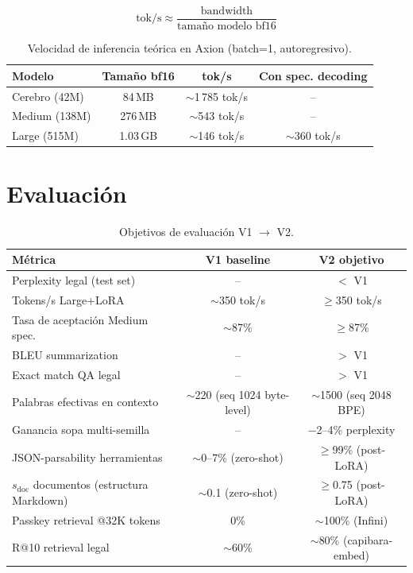 \documentclass[11pt,a4paper]{article}
\begin{document}
\begin{equation}
  \text{tok/s} \approx \frac{\text{bandwidth}}{\text{tamaño modelo bf16}}
\end{equation}

\begin{table}[h]
\centering
\caption{Velocidad de inferencia teórica en Axion (batch=1, autoregresivo).}
\label{tab:speed}
\begin{tabular}{lccc}
\toprule
\textbf{Modelo} & \textbf{Tamaño bf16} & \textbf{tok/s} & \textbf{Con spec. decoding} \\
\midrule
Cerebro (42M)  & 84\,MB   & $\sim$1\,785 tok/s & --               \\
Medium (138M)  & 276\,MB  & $\sim$543 tok/s    & --               \\
Large (515M)   & 1.03\,GB & $\sim$146 tok/s    & $\sim$360 tok/s  \\
\bottomrule
\end{tabular}
\end{table}

\section{Evaluación}
\label{sec:eval}

\begin{table}[h]
\centering
\caption{Objetivos de evaluación V1 $\to$ V2.}
\label{tab:benchmarks}
\begin{tabular}{lcc}
\toprule
\textbf{Métrica} & \textbf{V1 baseline} & \textbf{V2 objetivo} \\
\midrule
Perplexity legal (test set) & -- & $<$ V1 \\
Tokens/s Large+LoRA & $\sim$350 tok/s & $\geq$350 tok/s \\
Tasa de aceptación Medium spec. & $\sim$87\% & $\geq$87\% \\
BLEU summarization & -- & $>$ V1 \\
Exact match QA legal & -- & $>$ V1 \\
Palabras efectivas en contexto & $\sim$220 (seq 1024 byte-level) & $\sim$1500 (seq 2048 BPE) \\
Ganancia sopa multi-semilla & -- & $-$2--4\% perplexity \\
JSON-parsability herramientas & $\sim$0--7\% (zero-shot) & $\geq$99\% (post-LoRA) \\
$s_{\text{doc}}$ documentos (estructura Markdown) & $\sim$0.1 (zero-shot) & $\geq$0.75 (post-LoRA) \\
Passkey retrieval @32K tokens & 0\% & $\sim$100\% (Infini) \\
R@10 retrieval legal & $\sim$60\% & $\sim$80\% (capibara-embed) \\
\bottomrule
\end{tabular}
\end{table}
\end{document}
